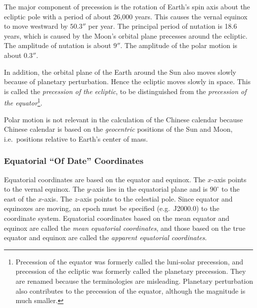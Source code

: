 \documentclass[12pt]{article}
\begin{document}
\begin{CJK}{UTF8}{bkai}
The major component of precession is the rotation of Earth's spin axis about the
ecliptic pole with a period of about 26,000 years. This causes the vernal equinox
to move westward by $50.3''$ per year. The principal period of nutation
is 18.6 years, which is caused by the Moon's orbital plane precesses around
the ecliptic. The amplitude of nutation is about $9''$. The amplitude
of the polar motion is about $0.3''$.

In addition, the orbital plane
of the Earth around the Sun also moves slowly because of planetary perturbation.
Hence the ecliptic moves slowly in space. This is called the
{\em precession of the ecliptic}, to be distinguished from
the {\em precession of the equator}\footnote{Precession of the equator was
formerly called the luni-solar precession, and precession of the ecliptic
was formerly called the planetary precession. They are renamed because the
terminologies are misleading. Planetary perturbation also contributes to
the precession of the equator, although the magnitude is much smaller.}.

Polar motion is not relevant in the calculation of the Chinese calendar because 
Chinese calendar is based on the {\em geocentric} positions of the Sun and Moon, i.e.\ 
positions relative to Earth's center of mass.

\subsubsection{Equatorial ``Of Date'' Coordinates}

Equatorial coordinates are based on the equator and equinox. The $x$-axis
points to the vernal equinox. The $y$-axis lies in the equatorial plane
and is $90^\circ$ to the east of the $x$-axis. The $z$-axis points to
the celestial pole. Since equator
and equinoxes are moving, an epoch must be specified (e.g.\ J2000.0) to the coordinate
system. Equatorial coordinates based on the mean equator and equinox are called the 
{\em mean equatorial coordinates}, and those based on the true equator and equinox 
are called the {\em apparent equatorial coordinates}. 


\end{CJK}
\end{document}
